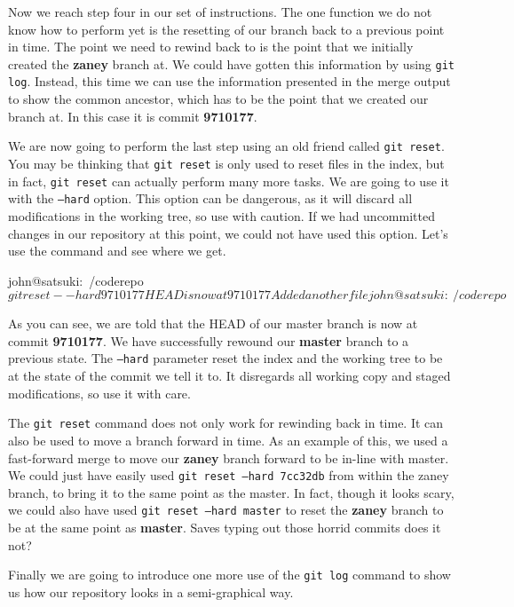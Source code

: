 Now we reach step four in our set of instructions.
The one function we do not know how to perform yet is the resetting of our branch back to a previous point in time.
The point we need to rewind back to is the point that we initially created the \textbf{zaney} branch at.
We could have gotten this information by using \texttt{git log}.
Instead, this time we can use the information presented in the merge output to show the common ancestor, which has to be the point that we created our branch at.
In this case it is commit \textbf{9710177}.

We are now going to perform the last step using an old friend called \texttt{git reset}.
You may be thinking that \texttt{git reset} is only used to reset files in the index, but in fact, \texttt{git reset} can actually perform many more tasks.
We are going to use it with the \texttt{--hard} option.
This option can be dangerous, as it will discard all modifications in the working tree, so use with caution.
If we had uncommitted changes in our repository at this point, we could not have used this option.
Let's use the command and see where we get.

\begin{code}
john@satsuki:~/coderepo$ git reset --hard 9710177
HEAD is now at 9710177 Added another file
john@satsuki:~/coderepo$
\end{code}

As you can see, we are told that the HEAD of our master branch is now at commit \textbf{9710177}.
We have successfully rewound our \textbf{master} branch to a previous state.
The \texttt{--hard} parameter reset the index and the working tree to be at the state of the commit we tell it to.
It disregards all working copy and staged modifications, so use it with care.

The \texttt{git reset} command does not only work for rewinding back in time.
It can also be used to move a branch forward in time.
As an example of this, we used a fast-forward merge to move our \textbf{zaney} branch forward to be in-line with master.
We could just have easily used \texttt{git reset --hard 7cc32db} from within the zaney branch, to bring it to the same point as the master.
In fact, though it looks scary, we could also have used \texttt{git reset --hard master} to reset the \textbf{zaney} branch to be at the same point as \textbf{master}.
Saves typing out those horrid commits does it not?

Finally we are going to introduce one more use of the \texttt{git log} command to show us how our repository looks in a semi-graphical way.

